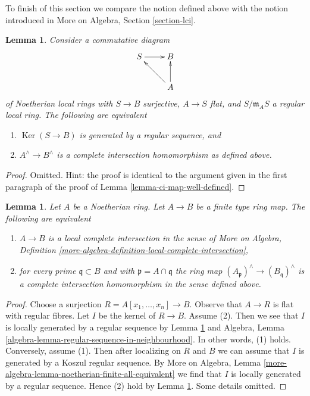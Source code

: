 \documentclass{stacks-project}
\theoremstyle{plain}
\newtheorem{lemma}[subsection]{Lemma}
\theoremstyle{definition}
\theoremstyle{remark}
\numberwithin{equation}{subsection}
\def\Ker{\mathop{\mathrm{Ker}}}
\begin{document}
\noindent
To finish of this section we compare the notion defined above
with the notion introduced in
More on Algebra, Section \ref{section-lci}.

\begin{lemma}
\label{lemma-well-defined-if-you-can-find-good-factorization}
Consider a commutative diagram
$$
\xymatrix{
S \ar[r] & B \\
& A \ar[lu] \ar[u]
}
$$
of Noetherian local rings with $S \to B$ surjective, $A \to S$ flat, and
$S/\mathfrak m_A S$ a regular local ring. The following are equivalent
\begin{enumerate}
\item $\Ker(S \to B)$ is generated by a regular sequence, and
\item $A^\wedge \to B^\wedge$ is a complete intersection homomorphism
as defined above.
\end{enumerate}
\end{lemma}

\begin{proof}
Omitted. Hint: the proof is identical to the argument given in
the first paragraph of the proof of Lemma \ref{lemma-ci-map-well-defined}.
\end{proof}

\begin{lemma}
\label{lemma-finite-type-lci-map}
Let $A$ be a Noetherian ring.
Let $A \to B$ be a finite type ring map.
The following are equivalent
\begin{enumerate}
\item $A \to B$ is a local complete intersection in the sense of
More on Algebra, Definition
\ref{more-algebra-definition-local-complete-intersection},
\item for every prime $\mathfrak q \subset B$ and with
$\mathfrak p = A \cap \mathfrak q$ the ring map
$(A_\mathfrak p)^\wedge \to (B_\mathfrak q)^\wedge$ is
a complete intersection homomorphism in the sense defined above.
\end{enumerate}
\end{lemma}

\begin{proof}
Choose a surjection $R = A[x_1, \ldots, x_n] \to B$.
Observe that $A \to R$ is flat with regular fibres.
Let $I$ be the kernel of $R \to B$.
Assume (2). Then we see that
$I$ is locally generated by a regular sequence
by
Lemma \ref{lemma-well-defined-if-you-can-find-good-factorization}
and
Algebra, Lemma \ref{algebra-lemma-regular-sequence-in-neighbourhood}.
In other words, (1) holds.
Conversely, assume (1). Then after localizing on $R$ and $B$
we can assume that $I$ is generated by a Koszul regular sequence.
By More on Algebra, Lemma
\ref{more-algebra-lemma-noetherian-finite-all-equivalent}
we find that $I$ is locally generated by a regular sequence.
Hence (2) hold by
Lemma \ref{lemma-well-defined-if-you-can-find-good-factorization}.
Some details omitted.
\end{proof}
\end{document}
